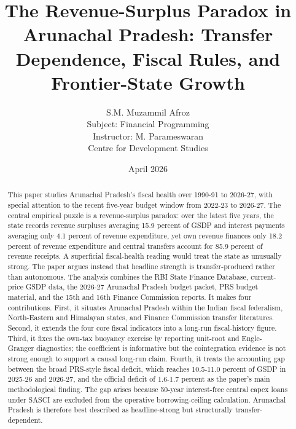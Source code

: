 \documentclass[11pt,a4paper]{article}
\begin{document}
\title{\textbf{The Revenue-Surplus Paradox in Arunachal Pradesh: Transfer Dependence, Fiscal Rules, and Frontier-State Growth}}
\author{S.M. Muzammil Afroz\\
Subject: Financial Programming\\
Instructor: M. Parameswaran\\
Centre for Development Studies}
\date{April 2026}
\maketitle

\begin{abstract}
This paper studies Arunachal Pradesh's fiscal health over 1990-91 to 2026-27, with special attention to the recent five-year budget window from 2022-23 to 2026-27. The central empirical puzzle is a revenue-surplus paradox: over the latest five years, the state records revenue surpluses averaging 15.9 percent of GSDP and interest payments averaging only 4.1 percent of revenue expenditure, yet own revenue finances only 18.2 percent of revenue expenditure and central transfers account for 85.9 percent of revenue receipts. A superficial fiscal-health reading would treat the state as unusually strong. The paper argues instead that headline strength is transfer-produced rather than autonomous. The analysis combines the RBI State Finance Database, current-price GSDP data, the 2026-27 Arunachal Pradesh budget packet, PRS budget material, and the 15th and 16th Finance Commission reports. It makes four contributions. First, it situates Arunachal Pradesh within the Indian fiscal federalism, North-Eastern and Himalayan states, and Finance Commission transfer literatures. Second, it extends the four core fiscal indicators into a long-run fiscal-history figure. Third, it fixes the own-tax buoyancy exercise by reporting unit-root and Engle-Granger diagnostics; the coefficient is informative but the cointegration evidence is not strong enough to support a causal long-run claim. Fourth, it treats the accounting gap between the broad PRS-style fiscal deficit, which reaches 10.5-11.0 percent of GSDP in 2025-26 and 2026-27, and the official deficit of 1.6-1.7 percent as the paper's main methodological finding. The gap arises because 50-year interest-free central capex loans under SASCI are excluded from the operative borrowing-ceiling calculation. Arunachal Pradesh is therefore best described as headline-strong but structurally transfer-dependent.
\end{abstract}
\end{document}
